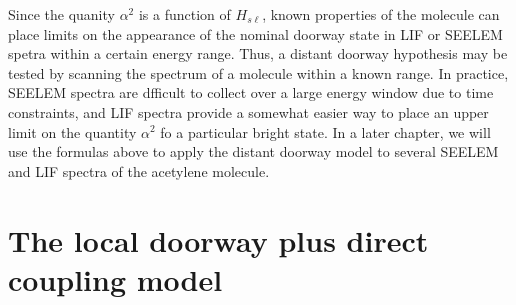 \documentclass[12pt]{mitthesis}
\begin{document}
Since the quanity $\alpha^2$ is a function of $H_{s\ell}$, known
properties of the molecule can place limits on the
appearance of the nominal doorway state in LIF or SEELEM spetra within
a certain energy range.  Thus, a distant doorway hypothesis may be
tested by scanning the spectrum of a molecule within a known range.
In practice, SEELEM spectra are dfficult to collect over a large
energy window due to time constraints, and LIF spectra provide a
somewhat easier way to place an upper limit on the quantity $\alpha^2$
fo a particular bright state.  In a later chapter, we will use the
formulas above to apply the distant doorway model to several SEELEM
and LIF spectra of the acetylene molecule.

\section{The local doorway plus direct coupling model}
\label{sec:model-local-plus-direct}
\end{document}
